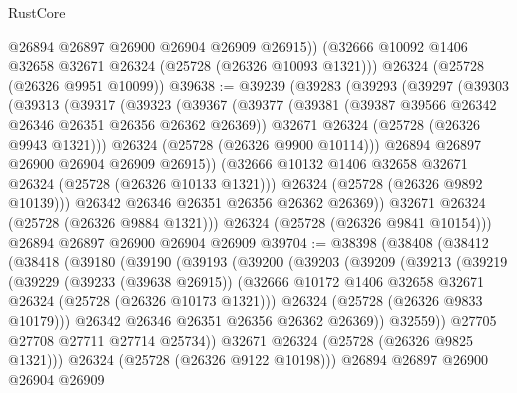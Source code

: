 \begin{lexlean}{RustCore}
\begin{coremodule}
        @26894
        @26897
        @26900
        @26904
        @26909
        @26915))
    (@32666 @10092 @1406 @32658 @32671 @26324 (@25728 (@26326 @10093 @1321)))
    @26324
    (@25728 (@26326 @9951 @10099))
@39638 := @39239
    (@39283
      (@39293
        (@39297
          (@39303
            (@39313
              (@39317
                (@39323
                  (@39367
                    (@39377
                      (@39381 (@39387 @39566 @26342 @26346 @26351 @26356 @26362 @26369))
                      @32671
                      @26324
                      (@25728 (@26326 @9943 @1321)))
                    @26324
                    (@25728 (@26326 @9900 @10114)))
                  @26894
                  @26897
                  @26900
                  @26904
                  @26909
                  @26915))
              (@32666 @10132 @1406 @32658 @32671 @26324 (@25728 (@26326 @10133 @1321)))
              @26324
              (@25728 (@26326 @9892 @10139)))
            @26342
            @26346
            @26351
            @26356
            @26362
            @26369))
        @32671
        @26324
        (@25728 (@26326 @9884 @1321)))
      @26324
      (@25728 (@26326 @9841 @10154)))
    @26894
    @26897
    @26900
    @26904
    @26909
@39704 := @38398
    (@38408
      (@38412
        (@38418
          (@39180
            (@39190
              (@39193
                (@39200
                  (@39203
                    (@39209
                      (@39213
                        (@39219
                          (@39229
                            (@39233 (@39638 @26915))
                            (@32666
                              @10172
                              @1406
                              @32658
                              @32671
                              @26324
                              (@25728 (@26326 @10173 @1321)))
                            @26324
                            (@25728 (@26326 @9833 @10179)))
                          @26342
                          @26346
                          @26351
                          @26356
                          @26362
                          @26369))
                      @32559))
                  @27705
                  @27708
                  @27711
                  @27714
                  @25734))
              @32671
              @26324
              (@25728 (@26326 @9825 @1321)))
            @26324
            (@25728 (@26326 @9122 @10198)))
          @26894
          @26897
          @26900
          @26904
          @26909

\end{coremodule}
\end{lexlean}

